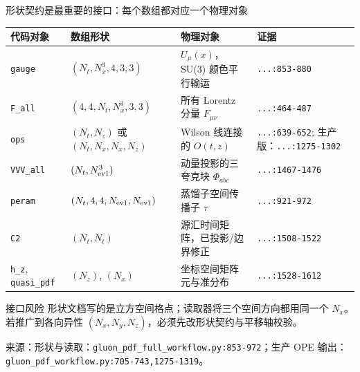 \documentclass[UTF8,aspectratio=169,11pt]{ctexbeamer}
\newcommand{\source}[1]{%
  \vspace{0.06em}\par{\raggedright\scriptsize\color{muted}来源：#1\par}}
\newcommand{\codepath}[1]{\nolinkurl{#1}}
\begin{document}
\begin{frame}[t]{形状契约是最重要的接口：每个数组都对应一个物理对象}
  \centering
  \scriptsize
  \begin{tabularx}{0.96\textwidth}{@{}lYlY@{}}
    \toprule
    代码对象 & 数组形状 & 物理对象 & 证据 \\
    \midrule
    \codepath{gauge} & \((N_t,N_x^3,4,3,3)\) & \(U_\mu(x)\)，SU(3) 颜色平行输运 & \codepath{...:853-880} \\
    \codepath{F_all} & \((4,4,N_t,N_x^3,3,3)\) & 所有 Lorentz 分量 \(F_{\mu\nu}\) & \codepath{...:464-487} \\
    \codepath{ops} & \((N_t,N_z)\) 或 \((N_t,N_x,N_x,N_z)\) & Wilson 线连接的 \(O(t,z)\) & \codepath{...:639-652}; 生产版：\codepath{...:1275-1302} \\
    \codepath{VVV\_all} & \((N_t,N_{\rm ev1}^3)\) & 动量投影的三夸克块 \(\Phi_{abc}\) & \codepath{...:1467-1476} \\
    \codepath{peram} & \((N_t,4,4,N_{\rm ev1},N_{\rm ev1})\) & 蒸馏子空间传播子 \(\tau\) & \codepath{...:921-972} \\
    \codepath{C2} & \((N_t,N_t)\) & 源汇时间矩阵，已投影/边界修正 & \codepath{...:1508-1522} \\
    \codepath{h\_z}, \codepath{quasi\_pdf} & \((N_z)\), \((N_x)\) & 坐标空间矩阵元与准分布 & \codepath{...:1528-1612} \\
    \bottomrule
  \end{tabularx}
  \vspace{0.18cm}
  \begin{block}{接口风险}
    形状文档写的是立方空间格点；读取器将三个空间方向都用同一个 \(N_x\)。
    若推广到各向异性 \((N_x,N_y,N_z)\)，必须先改形状契约与平移轴校验。
  \end{block}
  \source{形状与读取：\codepath{gluon_pdf_full_workflow.py:853-972}；生产 OPE 输出：\codepath{gluon_pdf_workflow.py:705-743,1275-1319}。}
\end{frame}
\end{document}
